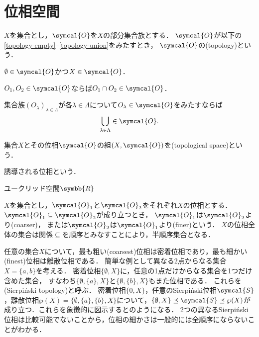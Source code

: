 \documentclass{ltjsbook}
\begin{document}
\section{位相空間}
\begin{thmbox}
\begin{definition}
\(X\)を集合とし，\(\symcal{O}\)を\(X\)の部分集合族とする．
\(\symcal{O}\)が以下の\ref{topology-empty}--\ref{topology-union}をみたすとき，
\(\symcal{O}\)の(topology)という．
\begin{conditions}
    \item\label{topology-empty} \(\emptyset \in \symcal{O}\)かつ\(X \in \symcal{O}\)．
    \item\label{topology-intersection} \(O_1, O_2 \in \symcal{O}\)ならば\(O_1 \cap O_2 \in \symcal{O}\)．
    \item\label{topology-union} 集合族\({(O_\lambda)}_{\lambda \in \Lambda}\)が各\(\lambda \in \Lambda\)について\(O_\lambda \in \symcal{O}\)をみたすならば
        \begin{align}
            \bigcup_{\lambda \in \Lambda} \in \symcal{O}.
        \end{align}
\end{conditions}
集合\(X\)とその位相\(\symcal{O}\)の組\(\tuple{X, \symcal{O}}\)を(topological space)という．
\end{definition}
\end{thmbox}

\begin{thmbox}
\begin{definition}
誘導される位相という．
\end{definition}
\end{thmbox}

\begin{example}
ユークリッド空間\(\symbb{R}\)
\end{example}

\(X\)を集合とし，\(\symcal{O}_1\)と\(\symcal{O}_2\)をそれぞれ\(X\)の位相とする．
\(\symcal{O}_1 \subseteq \symcal{O}_2\)が成り立つとき，
\(\symcal{O}_1\)は\(\symcal{O}_2\)より(coarser)，
または\(\symcal{O}_2\)は\(\symcal{O}_1\)より(finer)という．
\(X\)の位相全体の集合は関係\(\subseteq\)を順序とみなすことにより，半順序集合となる．

任意の集合\(X\)について，最も粗い(coarsest)位相は密着位相であり，最も細かい(finest)位相は離散位相である．
簡単な例として異なる2点からなる集合\(X = \{a, b\}\)を考える．
密着位相\(\{\emptyset, X\}\)に，任意の1点だけからなる集合を1つだけ含めた集合，
すなわち\(\{\emptyset, \{a\}, X\}\)と\(\{\emptyset, \{b\}, X\}\)もまた位相である．
これらを(Sierpiński topology)と呼ぶ．
密着位相\(\{0, X\}\)，任意のSierpiński位相\(\symcal{S}\)，離散位相\(\wp(X) = \{\emptyset, \{a\}, \{b\}, X\}\)について，\(\{\emptyset, X\} \preceq \symcal{S} \preceq \wp(X)\)が成り立つ．これらを象徴的に図示するとのようになる．
2つの異なるSierpiński位相は比較可能でないことから，位相の細かさは一般的には全順序にならないことがわかる．
\end{document}
